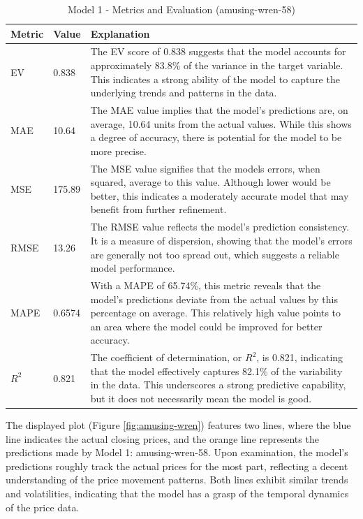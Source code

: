 \begin{table}[H]
\centering
\begin{tabular}{l l p{10cm}}
\textbf{Metric} & \textbf{Value} & \textbf{Explanation} \\
\hline
EV & 0.838 & The EV score of 0.838 suggests that the model accounts for approximately 83.8\% of the variance in the target variable. This indicates a strong ability of the model to capture the underlying trends and patterns in the data. \\
MAE & 10.64 & The MAE value implies that the model's predictions are, on average, 10.64 units from the actual values. While this shows a degree of accuracy, there is potential for the model to be more precise. \\
MSE & 175.89 & The MSE value signifies that the models errors, when squared, average to this value. Although lower would be better, this indicates a moderately accurate model that may benefit from further refinement. \\
RMSE & 13.26 & The RMSE value reflects the model's prediction consistency. It is a measure of dispersion, showing that the model's errors are generally not too spread out, which suggests a reliable model performance. \\
MAPE & 0.6574 & With a MAPE of 65.74\%, this metric reveals that the model's predictions deviate from the actual values by this percentage on average. This relatively high value points to an area where the model could be improved for better accuracy. \\
\( R^2 \) & 0.821 & The coefficient of determination, or \( R^2 \), is 0.821, indicating that the model effectively captures 82.1\% of the variability in the data. This underscores a strong predictive capability, but it does not necessarily mean the model is good. \\
\end{tabular}
\caption{Model 1 - Metrics and Evaluation (amusing-wren-58)}
\label{table:model_1_evaluation}
\end{table}

The displayed plot (Figure \ref{fig:amusing-wren})  features two lines, where the blue line indicates the actual closing prices, and the orange line represents the predictions made by Model 1: amusing-wren-58. Upon examination, the model's predictions roughly track the actual prices for the most part, reflecting a decent  understanding of the price movement patterns. Both lines exhibit similar trends and volatilities, indicating that the model has a grasp of the temporal dynamics of the price data. \\

